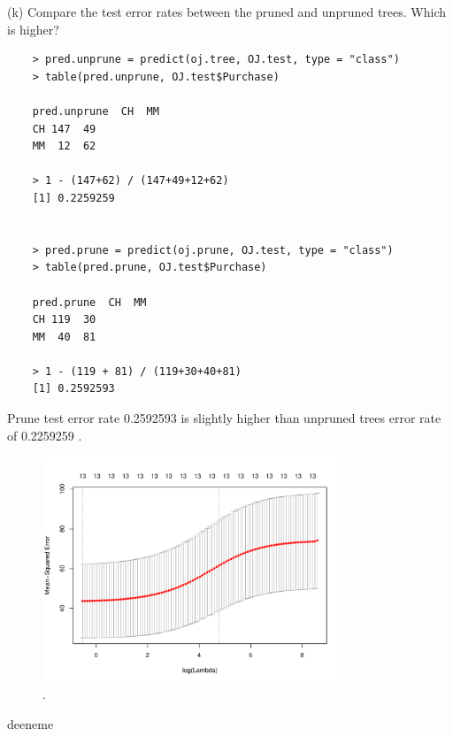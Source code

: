 \documentclass{article}
\begin{document}
(k) Compare the test error rates between the pruned and unpruned trees. Which is higher?\\

\begin{program}
	\begin{verbatim}
	> pred.unprune = predict(oj.tree, OJ.test, type = "class")
	> table(pred.unprune, OJ.test$Purchase)
	
	pred.unprune  CH  MM
	CH 147  49
	MM  12  62
	
	> 1 - (147+62) / (147+49+12+62)
	[1] 0.2259259
	
	
	> pred.prune = predict(oj.prune, OJ.test, type = "class")
	> table(pred.prune, OJ.test$Purchase)
	
	pred.prune  CH  MM
	CH 119  30
	MM  40  81
	
	> 1 - (119 + 81) / (119+30+40+81)
	[1] 0.2592593
	\end{verbatim}
\end{program}

Prune test error rate 0.2592593 is slightly higher than unpruned trees error rate of 0.2259259 .



\newpage






\begin{figure}[htb]
	\begin{center}
		\includegraphics[width=0.8\textwidth]{MTH522_hw7_p1_1.pdf}
	\end{center}
	\caption{.}
	\label{fig:MTH522_hw7_p1_1}
\end{figure}

\newpage
deeneme
\newpage


\begin{program}
	\begin{verbatim}
	
	\end{verbatim}
\end{program}
\end{document}
